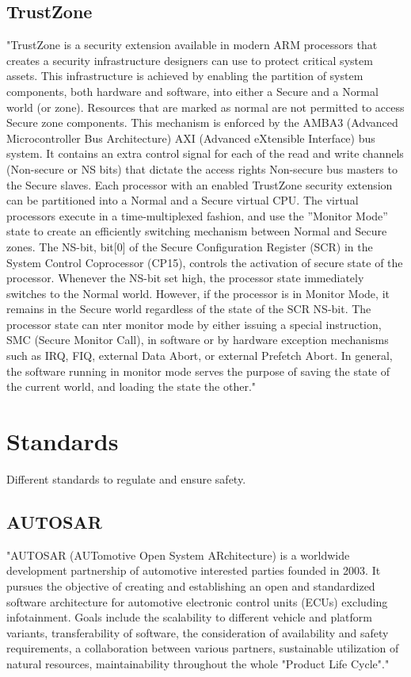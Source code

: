 \subsection{TrustZone}
\label{sec:trustzone}
"TrustZone is a security extension available in modern ARM processors that creates a security infrastructure designers can use to protect critical system assets. This infrastructure is achieved by enabling the partition of system components, both hardware and software, into either a Secure and a Normal world (or zone). Resources that are marked as normal are not permitted to access Secure zone components. This mechanism is enforced by the AMBA3 (Advanced Microcontroller Bus Architecture) AXI (Advanced eXtensible Interface) bus system. It contains an extra control signal for each of the read and write channels (Non-secure or NS bits) that dictate the access rights Non-secure bus masters to the Secure slaves. Each processor with an enabled TrustZone security extension can be partitioned into a Normal and a Secure virtual CPU. The virtual processors execute in a time-multiplexed fashion, and use the ”Monitor Mode” state to create an efficiently switching mechanism between Normal and Secure zones. The NS-bit, bit[0] of the Secure Configuration Register (SCR) in the System Control Coprocessor (CP15), controls the activation of secure state of the processor. Whenever the NS-bit set high, the processor state immediately switches to the Normal world. However, if the processor is in Monitor Mode, it remains in the Secure world regardless of the state of the SCR NS-bit. The processor state can nter monitor mode by either issuing a special instruction, SMC (Secure Monitor Call), in software or by hardware exception mechanisms such as IRQ, FIQ, external Data Abort, or external Prefetch Abort. In general, the software running in monitor mode serves the purpose of saving the state of the current world, and loading the state the other."~\cite{website:ARM} \\ %

\section{Standards}
Different standards to regulate and ensure safety.

\subsection{AUTOSAR}
"AUTOSAR (AUTomotive Open System ARchitecture) is a worldwide development partnership of automotive interested parties founded in 2003. It pursues the objective of creating and establishing an open and standardized software architecture for automotive electronic control units (ECUs) excluding infotainment. Goals include the scalability to different vehicle and platform variants, transferability of software, the consideration of availability and safety requirements, a collaboration between various partners, sustainable utilization of natural resources, maintainability throughout the whole "Product Life Cycle"."~\cite{website:autosar}

